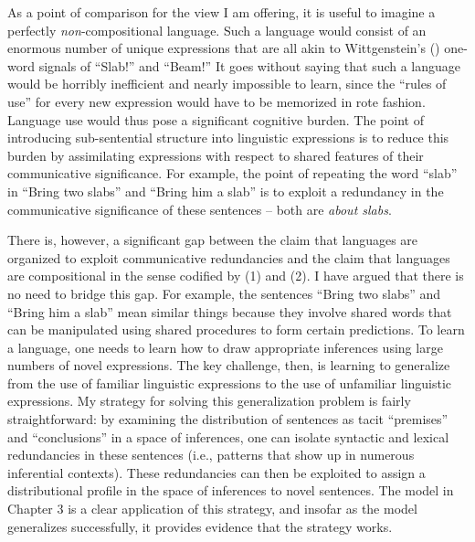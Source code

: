 As a point of comparison for the view I am offering, it is useful to imagine a perfectly \textit{non}-compositional language. Such a language would consist of an enormous number of unique expressions that are all akin to Wittgenstein's (\citeyear{Wittgenstein:1953}) one-word signals of ``Slab!'' and ``Beam!'' It goes without saying that such a language would be horribly inefficient and nearly impossible to learn, since the ``rules of use'' for every new expression would have to be memorized in rote fashion. Language use would thus pose a significant cognitive burden. The point of introducing sub-sentential structure into linguistic expressions is to reduce this burden by assimilating expressions with respect to shared features of their communicative significance. For example, the point of repeating the word ``slab'' in ``Bring two slabs'' and ``Bring him a slab'' is to exploit a redundancy in the communicative significance of these sentences -- both are \textit{about slabs}. 

There is, however, a significant gap between the claim that languages are organized to exploit communicative redundancies and the claim that languages are compositional in the sense codified by (1) and (2). I have argued that there is no need to bridge this gap. For example, the sentences ``Bring two slabs'' and ``Bring him a slab'' mean similar things because they involve shared words that can be manipulated using shared procedures to form certain predictions. To learn a language, one needs to learn how to draw appropriate inferences using large numbers of novel expressions. The key challenge, then, is learning to generalize from the use of familiar linguistic expressions to the use of unfamiliar linguistic expressions. My strategy for solving this generalization problem is fairly straightforward: by examining the distribution of sentences as tacit ``premises'' and ``conclusions'' in a space of inferences, one can isolate syntactic and lexical redundancies in these sentences (i.e., patterns that show up in numerous inferential contexts). These redundancies can then be exploited to assign a distributional profile in the space of inferences to novel sentences.  The model in Chapter 3 is a clear application of this strategy, and insofar as the model generalizes successfully, it provides evidence that the strategy works. 

